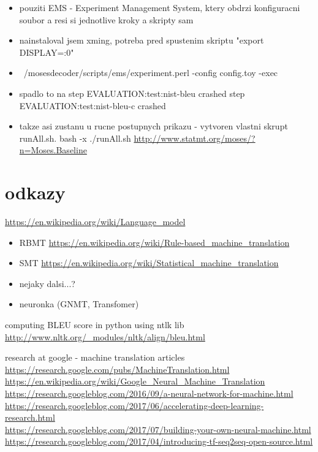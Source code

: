 \begin{itemize}
  \begin{itemize}
    \item pouziti EMS - Experiment Management System, ktery obdrzi konfiguracni soubor a resi si jednotlive kroky a skripty sam
    \item nainstaloval jsem xming, potreba pred spustenim skriptu "export DISPLAY=:0"
    \item ~/mosesdecoder/scripts/ems/experiment.perl -config config.toy -exec
    \item spadlo to na step EVALUATION:test:nist-bleu crashed step EVALUATION:test:nist-bleu-c crashed
    \item takze asi zustanu u rucne postupnych prikazu - vytvoren vlastni skrupt runAll.sh. bash -x ./runAll.sh \url{http://www.statmt.org/moses/?n=Moses.Baseline}
  \end{itemize}
\end{itemize}

\section{odkazy}
\url{https://en.wikipedia.org/wiki/Language_model}

\begin{itemize}
    \item RBMT \url{https://en.wikipedia.org/wiki/Rule-based_machine_translation}
    \item SMT \url{https://en.wikipedia.org/wiki/Statistical_machine_translation}
    \item nejaky dalsi...?
    \item neuronka (GNMT, Transfomer)
\end{itemize}

computing BLEU score in python using ntlk lib \url{http://www.nltk.org/_modules/nltk/align/bleu.html}

research at google - machine translation articles \\ \url{https://research.google.com/pubs/MachineTranslation.html}\\
\url{https://en.wikipedia.org/wiki/Google_Neural_Machine_Translation}\\

\url{https://research.googleblog.com/2016/09/a-neural-network-for-machine.html}\\

\url{https://research.googleblog.com/2017/06/accelerating-deep-learning-research.html} \\
\url{https://research.googleblog.com/2017/07/building-your-own-neural-machine.html} \\
\url{https://research.googleblog.com/2017/04/introducing-tf-seq2seq-open-source.html}\\

